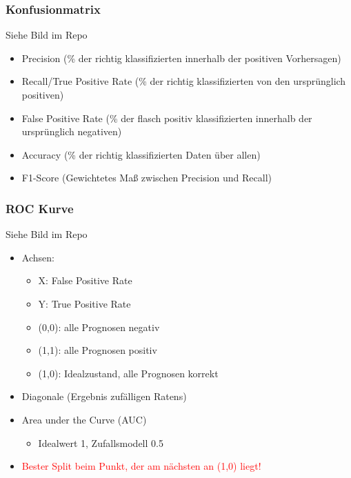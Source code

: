 \documentclass[a4paper]{article}
\begin{document}
\begin{landscape}
\begin{multicols}{3}
        \subsubsection{Konfusionmatrix}
        Siehe Bild im Repo
        \begin{itemize}[noitemsep,nolistsep]
            \item Precision (\% der richtig klassifizierten innerhalb der positiven Vorhersagen)
            \item Recall/True Positive Rate (\% der richtig klassifizierten von den ursprünglich positiven)
            \item False Positive Rate (\% der flasch positiv klassifizierten innerhalb der ursprünglich negativen)
            \item Accuracy (\% der richtig klassifizierten Daten über allen)
            \item F1-Score (Gewichtetes Maß zwischen Precision und Recall)
        \end{itemize}

        \subsubsection{ROC Kurve}
        Siehe Bild im Repo
        \begin{itemize}[noitemsep,nolistsep]
            \item Achsen:
                \begin{itemize}[noitemsep,nolistsep]
                    \item X: False Positive Rate
                    \item Y: True Positive Rate
                    \item (0,0): alle Prognosen negativ
                    \item (1,1): alle Prognosen positiv 
                    \item (1,0): Idealzustand, alle Prognosen korrekt
                \end{itemize}
            \item Diagonale (Ergebnis zufälligen Ratens)
            \item Area under the Curve (AUC)
            \begin{itemize}[noitemsep,nolistsep]
                \item Idealwert 1, Zufallsmodell 0.5
            \end{itemize}
            \item \textcolor{red}{Bester Split beim Punkt, der am nächsten an (1,0) liegt!}
        \end{itemize}


\end{multicols}
\end{landscape}
\end{document}
